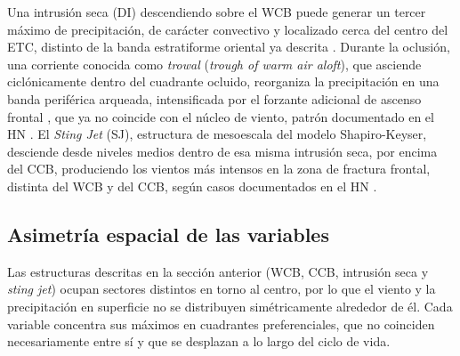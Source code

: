 Una intrusión seca (DI) descendiendo sobre el WCB puede generar un tercer máximo de precipitación, de carácter convectivo y localizado cerca del centro del ETC, distinto de la banda estratiforme oriental ya descrita \citep{sawada2021heavy}.
Durante la oclusión, una corriente conocida como \textit{trowal} (\textit{trough of warm air aloft}), que asciende ciclónicamente dentro del cuadrante ocluido, reorganiza la precipitación en una banda periférica arqueada, intensificada por el forzante adicional de ascenso frontal \citep{naud2025lifecycle}, que ya no coincide con el núcleo de viento, patrón documentado en el HN \citep{martin1999forcing}.
El \textit{Sting Jet} (SJ), estructura de mesoescala del modelo Shapiro-Keyser, desciende desde niveles medios dentro de esa misma intrusión seca, por encima del CCB, produciendo los vientos más intensos en la zona de fractura frontal, distinta del WCB y del CCB, según casos documentados en el HN \citep{clark2005sting, clark2018sting, martinez2014cold}.

\subsection{Asimetría espacial de las variables}\label{subsec:tb_kde_asimetria}

Las estructuras descritas en la sección anterior (WCB, CCB, intrusión seca y \textit{sting jet}) ocupan sectores distintos en torno al centro, por lo que el viento y la precipitación en superficie no se distribuyen simétricamente alrededor de él.
Cada variable concentra sus máximos en cuadrantes preferenciales, que no coinciden necesariamente entre sí y que se desplazan a lo largo del ciclo de vida.

